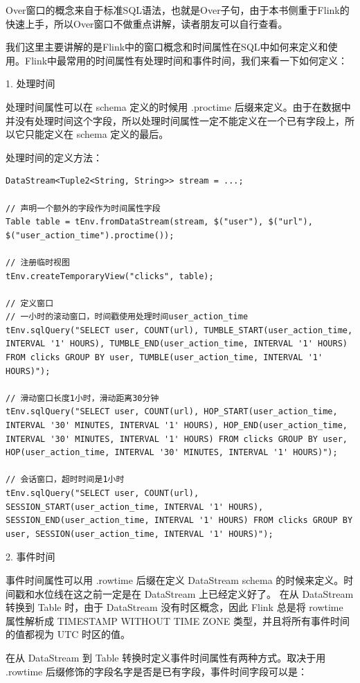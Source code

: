 \documentclass[cn,11pt,chinese]{elegantbook}
\begin{document}
Over窗口的概念来自于标准SQL语法，也就是Over子句，由于本书侧重于Flink的快速上手，所以Over窗口不做重点讲解，读者朋友可以自行查看。

我们这里主要讲解的是Flink中的窗口概念和时间属性在SQL中如何来定义和使用。Flink中最常用的时间属性有处理时间和事件时间，我们来看一下如何定义：

1. 处理时间

处理时间属性可以在 schema 定义的时候用 .proctime 后缀来定义。由于在数据中并没有处理时间这个字段，所以处理时间属性一定不能定义在一个已有字段上，所以它只能定义在 schema 定义的最后。

处理时间的定义方法：

\begin{verbatim}
DataStream<Tuple2<String, String>> stream = ...;

// 声明一个额外的字段作为时间属性字段
Table table = tEnv.fromDataStream(stream, $("user"), $("url"), $("user_action_time").proctime());

// 注册临时视图
tEnv.createTemporaryView("clicks", table);

// 定义窗口
// 一小时的滚动窗口，时间戳使用处理时间user_action_time
tEnv.sqlQuery("SELECT user, COUNT(url), TUMBLE_START(user_action_time, INTERVAL '1' HOURS), TUMBLE_END(user_action_time, INTERVAL '1' HOURS) FROM clicks GROUP BY user, TUMBLE(user_action_time, INTERVAL '1' HOURS)");

// 滑动窗口长度1小时，滑动距离30分钟
tEnv.sqlQuery("SELECT user, COUNT(url), HOP_START(user_action_time, INTERVAL '30' MINUTES, INTERVAL '1' HOURS), HOP_END(user_action_time, INTERVAL '30' MINUTES, INTERVAL '1' HOURS) FROM clicks GROUP BY user, HOP(user_action_time, INTERVAL '30' MINUTES, INTERVAL '1' HOURS)");

// 会话窗口，超时时间是1小时
tEnv.sqlQuery("SELECT user, COUNT(url), SESSION_START(user_action_time, INTERVAL '1' HOURS), SESSION_END(user_action_time, INTERVAL '1' HOURS) FROM clicks GROUP BY user, SESSION(user_action_time, INTERVAL '1' HOURS)");
\end{verbatim}

2. 事件时间

事件时间属性可以用 .rowtime 后缀在定义 DataStream schema 的时候来定义。时间戳和水位线在这之前一定是在 DataStream 上已经定义好了。 在从 DataStream 转换到 Table 时，由于 DataStream 没有时区概念，因此 Flink 总是将 rowtime 属性解析成 TIMESTAMP WITHOUT TIME ZONE 类型，并且将所有事件时间的值都视为 UTC 时区的值。

在从 DataStream 到 Table 转换时定义事件时间属性有两种方式。取决于用 .rowtime 后缀修饰的字段名字是否是已有字段，事件时间字段可以是：
\end{document}
